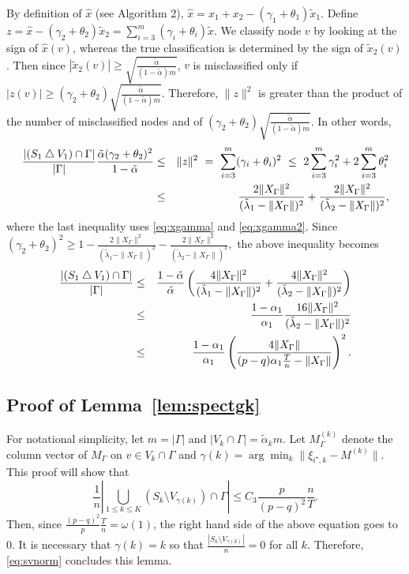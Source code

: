 By definition of $\hat{x}$ (see Algorithm 2), $\hat{x} = x_1 + x_2 - (\gamma_1 + \theta_1)
\tilde{x}_1.$ Define $z = \hat{x}-(\gamma_2 + \theta_2 )\tilde{x}_2 = \sum_{i=3}^{m} (\gamma_i + \theta_i) \tilde{x}$. We classify node $v$ by looking at the sign of $\hat{x}(v)$, whereas the true classification is determined by the sign of $\tilde{x}_2(v)$. Then since $|\tilde{x}_2 (v)| \ge \sqrt{\frac{\tilde{\alpha}}{(1-\tilde{\alpha})m}}$, $v$ is misclassified only if $|z(v)| \ge (\gamma_2 + \theta_2 ) \sqrt{\frac{\tilde{\alpha}}{(1-\tilde{\alpha})m}}$. Therefore, $\| z\|^2$ is greater than the product of the number of misclassified nodes and of $(\gamma_2 + \theta_2 ) \sqrt{\frac{\tilde{\alpha}}{(1-\tilde{\alpha})m}}$. In other words,
\begin{eqnarray*}
\frac{| (S_1 \bigtriangleup V_1)\cap \Gamma |}{|
  \Gamma |} \frac{\tilde{\alpha}(\gamma_2 + \theta_2 )^2}{1-\tilde{\alpha}} & \le & \|z\|^2 ~ = ~
\sum_{i=3}^m (\gamma_i + \theta_i)^2 ~ \le ~ 2\sum_{i=3}^m \gamma_i ^2+ 2\sum_{i=3}^m \theta_i^2\cr&  \le &
\frac{2\|X_{\Gamma}\|^2}{(\tilde{\lambda}_1 - \|X_{\Gamma}\|)^2} + \frac{2\|X_{\Gamma}\|^2}{(\tilde{\lambda}_2 - \|X_{\Gamma}\|)^2},
\end{eqnarray*}
where the last inequality uses \eqref{eq:xgamma} and \eqref{eq:xgamma2}.
Since $(\gamma_2 + \theta_2)^2 \ge 1-
\frac{2\|X_{\Gamma}\|^2}{(\tilde{\lambda}_1 - \|X_{\Gamma}\|)^2} -
\frac{2\|X_{\Gamma}\|^2}{(\tilde{\lambda}_2 - \|X_{\Gamma}\|)^2},$ the
above inequality becomes
\begin{eqnarray*}
\frac{| (S_1 \bigtriangleup V_1)\cap \Gamma |}{|
  \Gamma|}  & \le & \frac{1-\tilde{\alpha}}{\tilde{\alpha}}\left(\frac{4\|X_{\Gamma}\|^2}{(\tilde{\lambda}_1 - \|X_{\Gamma}\|)^2} + \frac{4\|X_{\Gamma}\|^2}{(\tilde{\lambda}_2 - \|X_{\Gamma}\|)^2}\right) \cr
& \le & \frac{1-\alpha_1}{\alpha_1} \frac{16\|X_{\Gamma}\|^2}{(\tilde{\lambda}_2 - \|X_{\Gamma}\|)^2} \cr
& \le & \frac{1-\alpha_1}{\alpha_1}\left( \frac{4\|X_{\Gamma}\|}{(p-q)\alpha_1\frac{T}{n} - \|X_{\Gamma}\|} \right)^2 .
\end{eqnarray*}

\subsection{Proof of Lemma~\ref{lem:spectgk}}
For notational simplicity, let $m= | \Gamma |$ and $ |V_k \cap \Gamma | =
  \tilde{\alpha}_k m.$
Let $M_{\Gamma}^{(k)}$ denote the column vector of $M_{\Gamma}$ on $v
\in V_{k} \cap \Gamma$ and $\gamma(k) = \arg\min_{k}\| \xi_{i^\star ,
  k}-M^{(k)} \|$. This proof will show that 
\begin{equation}\frac{1}{n}\left|\bigcup_{1\le k \le K}(S_k \setminus V_{\gamma(k)})\cap
  \Gamma\right| \le C_3 \frac{p}{(p-q)^2}\frac{n}{T} . \label{eq:svnorm}\end{equation}
Then, since $\frac{(p-q)^2}{p}\frac{T}{n} = \omega(1)$, the right hand
side of the above equation goes to 0. It is necessary that $\gamma(k)
= k$ so that $\frac{|S_k \setminus V_{\gamma(k)}|}{n} = 0$ for all
$k$. Therefore, \eqref{eq:svnorm} concludes this lemma.

